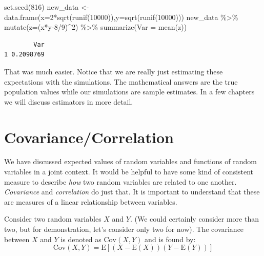 \documentclass[
  letterpaper,
  DIV=11,
  numbers=noendperiod]{scrreprt}
\newenvironment{Shaded}{\begin{snugshade}}{\end{snugshade}}
\newcommand{\AttributeTok}[1]{\textcolor[rgb]{0.40,0.45,0.13}{#1}}
\newcommand{\DecValTok}[1]{\textcolor[rgb]{0.68,0.00,0.00}{#1}}
\newcommand{\FunctionTok}[1]{\textcolor[rgb]{0.28,0.35,0.67}{#1}}
\newcommand{\NormalTok}[1]{\textcolor[rgb]{0.00,0.23,0.31}{#1}}
\newcommand{\OtherTok}[1]{\textcolor[rgb]{0.00,0.23,0.31}{#1}}
\newcommand{\SpecialCharTok}[1]{\textcolor[rgb]{0.37,0.37,0.37}{#1}}
\begin{document}
\begin{Shaded}
\begin{Highlighting}[]
\FunctionTok{set.seed}\NormalTok{(}\DecValTok{816}\NormalTok{)}
\NormalTok{new\_data }\OtherTok{\textless{}{-}} \FunctionTok{data.frame}\NormalTok{(}\AttributeTok{x=}\DecValTok{2}\SpecialCharTok{*}\FunctionTok{sqrt}\NormalTok{(}\FunctionTok{runif}\NormalTok{(}\DecValTok{10000}\NormalTok{)),}\AttributeTok{y=}\FunctionTok{sqrt}\NormalTok{(}\FunctionTok{runif}\NormalTok{(}\DecValTok{10000}\NormalTok{)))}
\NormalTok{new\_data }\SpecialCharTok{\%\textgreater{}\%}
  \FunctionTok{mutate}\NormalTok{(}\AttributeTok{z=}\NormalTok{(x}\SpecialCharTok{*}\NormalTok{y}\DecValTok{{-}8}\SpecialCharTok{/}\DecValTok{9}\NormalTok{)}\SpecialCharTok{\^{}}\DecValTok{2}\NormalTok{) }\SpecialCharTok{\%\textgreater{}\%}
  \FunctionTok{summarize}\NormalTok{(}\AttributeTok{Var =} \FunctionTok{mean}\NormalTok{(z))}
\end{Highlighting}
\end{Shaded}

\begin{verbatim}
        Var
1 0.2098769
\end{verbatim}

That was much easier. Notice that we are really just estimating these
expectations with the simulations. The mathematical answers are the true
population values while our simulations are sample estimates. In a few
chapters we will discuss estimators in more detail.

\section{Covariance/Correlation}\label{covariancecorrelation}

We have discussed expected values of random variables and functions of
random variables in a joint context. It would be helpful to have some
kind of consistent measure to describe \emph{how} two random variables
are related to one another. \emph{Covariance} and \emph{correlation} do
just that. It is important to understand that these are measures of a
linear relationship between variables.

Consider two random variables \(X\) and \(Y\). (We could certainly
consider more than two, but for demonstration, let's consider only two
for now). The covariance between \(X\) and \(Y\) is denoted as
\(\mbox{Cov}(X,Y)\) and is found by: \[
\mbox{Cov}(X,Y)=\mbox{E}\left[(X-\mbox{E}(X))(Y-\mbox{E}(Y))\right]
\]
\end{document}
